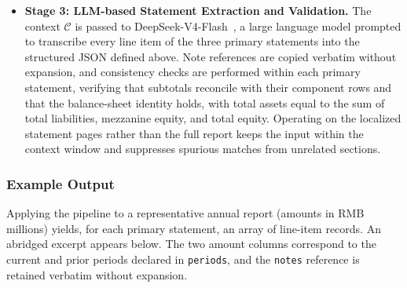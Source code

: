\begin{itemize}[
  leftmargin=1.0em,
  labelsep=0.5em
]
    \item \textbf{Stage 3: LLM-based Statement Extraction and Validation.} The context $\mathcal{C}$ is passed to DeepSeek-V4-Flash~\cite{deepseekai2026deepseekv4}, a large language model prompted to transcribe every line item of the three primary statements into the structured JSON defined above. Note references are copied verbatim without expansion, and consistency checks are performed within each primary statement, verifying that subtotals reconcile with their component rows and that the balance-sheet identity holds, with total assets equal to the sum of total liabilities, mezzanine equity, and total equity. Operating on the localized statement pages rather than the full report keeps the input within the context window and suppresses spurious matches from unrelated sections.
\end{itemize}

\subsubsection*{Example Output}
Applying the pipeline to a representative annual report (amounts in RMB millions) yields, for each primary statement, an array of line-item records. An abridged excerpt appears below. The two amount columns correspond to the current and prior periods declared in \texttt{periods}, and the \texttt{notes} reference is retained verbatim without expansion.

